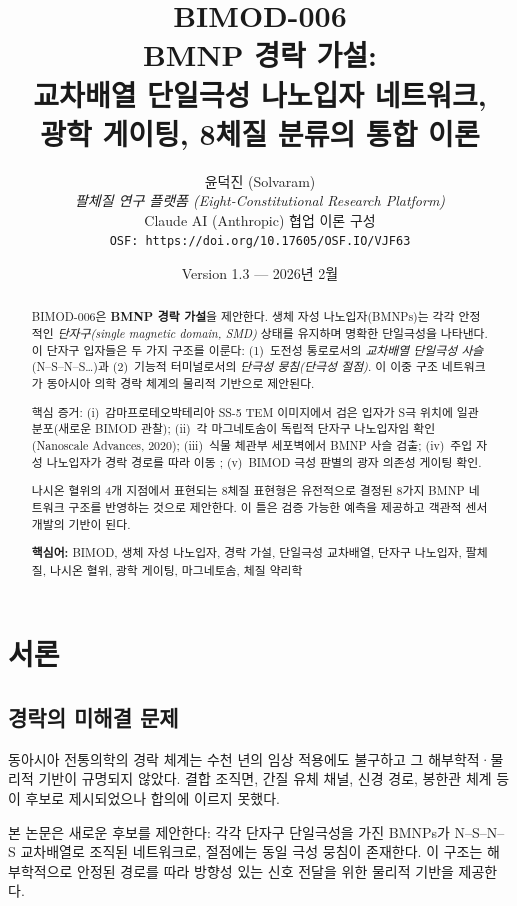 \documentclass[12pt,a4paper]{article}
\title{
  \textbf{BIMOD-006} \\[0.5em]
  \Large BMNP 경락 가설: \\
  교차배열 단일극성 나노입자 네트워크, \\
  광학 게이팅, 8체질 분류의 통합 이론
}
\author{
  윤덕진 (Solvaram) \\
  \textit{팔체질 연구 플랫폼 (Eight-Constitutional Research Platform)} \\
  \small Claude AI (Anthropic) 협업 이론 구성 \\
  \small \texttt{OSF: https://doi.org/10.17605/OSF.IO/VJF63}
}
\date{Version 1.3 --- 2026년 2월}
\begin{document}
\maketitle

\begin{abstract}
BIMOD-006은 \textbf{BMNP 경락 가설}을 제안한다. 생체 자성 나노입자(BMNPs)는 각각
안정적인 \emph{단자구(single magnetic domain, SMD)} 상태를 유지하며 명확한
단일극성을 나타낸다. 이 단자구 입자들은 두 가지 구조를 이룬다:
(1)~도전성 통로로서의 \emph{교차배열 단일극성 사슬}(N--S--N--S\ldots)과
(2)~기능적 터미널로서의 \emph{단극성 뭉침(단극성 절점)}.
이 이중 구조 네트워크가 동아시아 의학 경락 체계의 물리적 기반으로 제안된다.

핵심 증거: (i)~감마프로테오박테리아 SS-5 TEM 이미지에서 검은 입자가
S극 위치에 일관 분포(새로운 BIMOD 관찰); (ii)~각 마그네토솜이 독립적
단자구 나노입자임 확인(Nanoscale Advances, 2020); (iii)~식물 체관부 세포벽에서
BMNP 사슬 검출; (iv)~주입 자성 나노입자가 경락 경로를 따라 이동
\cite{johng2007}; (v)~BIMOD 극성 판별의 광자 의존성 게이팅 확인.

나시온 혈위의 4개 지점에서 표현되는 8체질 표현형은 유전적으로 결정된
8가지 BMNP 네트워크 구조를 반영하는 것으로 제안한다.
이 틀은 검증 가능한 예측을 제공하고 객관적 센서 개발의 기반이 된다.

\textbf{핵심어:} BIMOD, 생체 자성 나노입자, 경락 가설, 단일극성 교차배열,
단자구 나노입자, 팔체질, 나시온 혈위, 광학 게이팅, 마그네토솜, 체질 약리학
\end{abstract}

\tableofcontents
\newpage

\section{서론}

\subsection{경락의 미해결 문제}
동아시아 전통의학의 경락 체계는 수천 년의 임상 적용에도 불구하고
그 해부학적·물리적 기반이 규명되지 않았다.
결합 조직면, 간질 유체 채널, 신경 경로, 봉한관 체계 등이 후보로 제시되었으나
합의에 이르지 못했다.

본 논문은 새로운 후보를 제안한다: 각각 단자구 단일극성을 가진 BMNPs가
N--S--N--S 교차배열로 조직된 네트워크로, 절점에는 동일 극성 뭉침이 존재한다.
이 구조는 해부학적으로 안정된 경로를 따라 방향성 있는 신호 전달을 위한
물리적 기반을 제공한다.
\end{document}
